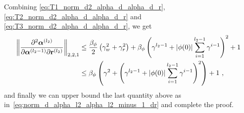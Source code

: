 Combining \eqref{eq:T1_norm_d2_alpha_d_alpha_d_r}, \eqref{eq:T2_norm_d2_alpha_d_alpha_d_r} and \eqref{eq:T3_norm_d2_alpha_d_alpha_d_r}, we get
    \begin{align}
        \begin{aligned}
                \left\|
                \frac{\partial^2 \boldsymbol{\alpha}^{\left(l_2\right)}}{\partial \boldsymbol{\alpha}^{\left(l_2-1\right)} \partial \mathbf{r}^{\left(l_2\right)}}
            \right\|_{2,2,1} 
            &\leq \frac{\beta_{\phi}}{2} \left( 
                \gamma_w^2 + \gamma_r^2
            \right) + \beta_{\phi} \left( \gamma^{l_2 - 1} + |\phi(0)|\sum_{i=1}^{l_2 - 1} \gamma^{i-1}\right)^2 + 1\\
            &\leq \beta_{\phi} \left( 
                \gamma^2 + \left(
                    \gamma^{l_2 - 1} + |\phi(0)| \sum_{i=1}^{l_2 - 1} \gamma^{i-1}
                \right)^2
            \right) + 1~,
        \end{aligned}
    \end{align}
and finally we can upper bound the last quantity above as in~\eqref{eq:norm_d_alpha_l2_alpha_l2_minus_1_dr} and complete the proof.
%
%

